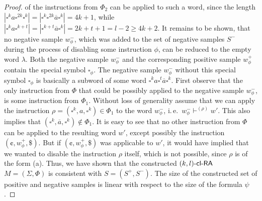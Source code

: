 \begin{proof}
of the instructions from $\Phi_2$ can be applied to such a word, since the length $|\square^k a \square^{2k} \square^k| = |\square^k \square^{2k} \overline{a} \square^k| = 4k + 1$, while $|\square^k a \square^{k+t}| = |\square^{k+t} \overline{a} \square^k| = 2k + t + 1 = l - 2 \ge 4k + 2$. It remains to be shown, that no negative sample $w_{\phi}^-$, which was added to the set of negative samples $S^-$ during the process of disabling some instruction $\phi$, can be reduced to the empty word $\lambda$. Both the negative sample $w_{\phi}^-$ and the corresponding positive sample $w_{\phi}^+$ contain the special symbol $\square_{\phi}$. The negative sample $w_{\phi}^-$ without this special symbol $\square_{\phi}$ is basically a subword of some word $\square^k a \square^t \overline{a} \square^k$. First observe that the only instruction from $\Phi$ that could be possibly applied to the negative sample $w_{\phi}^-$, is some instruction from $\Phi_1$. Without loss of generality assume that we can apply the instruction $\rho = (\square^k, a, \square^k) \in \Phi_1$ to the word $w_{\phi}^-$, i.\,e.\ $w_{\phi}^- \vdash^{(\rho)} w'$. This also implies that $(\square^k, \overline{a}, \square^k) \notin \Phi_1$. It is easy to see that no other instruction from $\Phi$ can be applied to the resulting word $w'$, except possibly the instruction $(\cent, w_{\phi}^+, \$)$. But if $(\cent, w_{\phi}^+, \$)$ was applicable to $w'$, it would have implied that we wanted to disable the instruction $\rho$ itself, which is not possible, since $\rho$ is of the form (a). Thus, we have shown that the constructed $\textup{\sf $(k,l)$-\textup{\sf cl-RA\/}}$ $M = (\Sigma, \Phi)$ is consistent with $S = (S^+, S^-)$. The size of the constructed set of positive and negative samples is linear with respect to the size of the formula $\psi$.


\end{proof}
